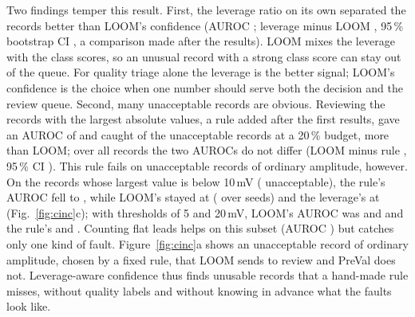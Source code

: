 \documentclass[preprint,12pt,authoryear]{elsarticle}
\begin{document}
Two findings temper this result. First, the leverage ratio on its own separated the records better than LOOM's confidence (AUROC \CincDetLev; leverage minus LOOM \CincLevMinusLoom, 95\,\% bootstrap CI \CincLevMinusLoomCI, a comparison made after the results). LOOM mixes the leverage with the class scores, so an unusual record with a strong class score can stay out of the queue. For quality triage alone the leverage is the better signal; LOOM's confidence is the choice when one number should serve both the decision and the review queue. Second, many unacceptable records are obvious. Reviewing the records with the largest absolute values, a rule added after the first results, gave an AUROC of \CincDetRuleAmp{} and caught \CincCaughtRuleAmp{} of the unacceptable records at a 20\,\% budget, more than LOOM; over all records the two AUROCs do not differ (LOOM minus rule \CincLoomMinusRule, 95\,\% CI \CincLoomMinusRuleCI). This rule fails on unacceptable records of ordinary amplitude, however. On the \CincSubTenN{} records whose largest value is below 10\,mV (\CincSubTenUnacc{} unacceptable), the rule's AUROC fell to \CincSubTenRuleAmp, while LOOM's stayed at \CincSubTenLoom{} (\CincSubTenRangeLoom{} over seeds) and the leverage's at \CincSubTenLev{} (Fig.~\ref{fig:cinc}c); with thresholds of 5 and 20\,mV, LOOM's AUROC was \CincSubFiveLoom{} and \CincSubTwentyLoom{} and the rule's \CincSubFiveRuleAmp{} and \CincSubTwentyRuleAmp. Counting flat leads helps on this subset (AUROC \CincSubTenRuleFlat) but catches only one kind of fault. Figure~\ref{fig:cinc}a shows an unacceptable record of ordinary amplitude, chosen by a fixed rule, that LOOM sends to review and PreVal does not. Leverage-aware confidence thus finds unusable records that a hand-made rule misses, without quality labels and without knowing in advance what the faults look like.

\begin{table}[!htbp]
\caption{CinC 2011 set A: \CincN{} records, \CincUnacc{} graded unacceptable; models trained on the clean PTB-XL training records and applied unchanged. ``Confidence'': review score $1-\max_k\hat p_k$. ``Det.\ AUROC'': separation of unacceptable from acceptable records (in brackets: range over \CincNSeeds{} seeds); ``Caught'': share of unacceptable records in the review queue at budgets of 10, 20 and 30\,\% (chance: the budget); ``Prec.'': share of unacceptable records in the 20\,\% queue. Means over seeds for the models of E23; deep baselines: E24. $^{\dagger}$Added after the first results (deviation D29); the flat-lead count has many ties, broken by record order.}\label{tab:cinc}
\centering\scriptsize

\end{table}
\end{document}
